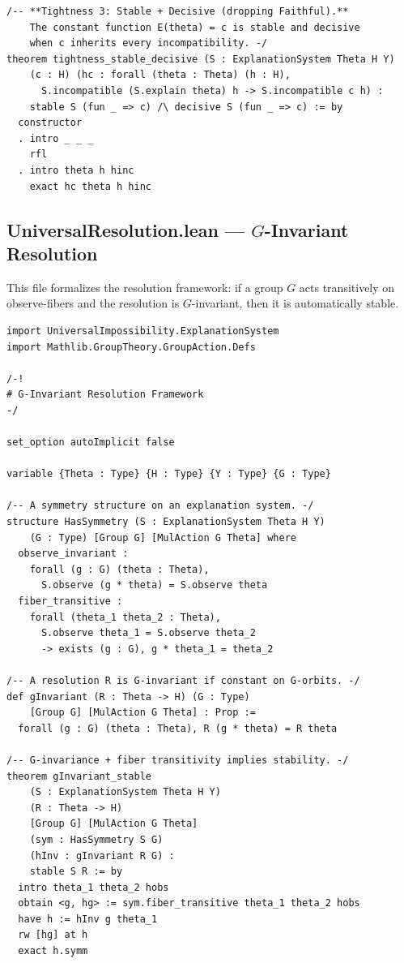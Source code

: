 \documentclass[11pt,a4paper]{article}
\begin{document}
\begin{lstlisting}[caption={ExplanationSystem.lean --- complete file},label={lst:explanation-system}]
/-- **Tightness 3: Stable + Decisive (dropping Faithful).**
    The constant function E(theta) = c is stable and decisive
    when c inherits every incompatibility. -/
theorem tightness_stable_decisive (S : ExplanationSystem Theta H Y)
    (c : H) (hc : forall (theta : Theta) (h : H),
      S.incompatible (S.explain theta) h -> S.incompatible c h) :
    stable S (fun _ => c) /\ decisive S (fun _ => c) := by
  constructor
  . intro _ _ _
    rfl
  . intro theta h hinc
    exact hc theta h hinc
\end{lstlisting}

\subsection[UniversalResolution.lean --- G-Invariant Resolution]{UniversalResolution.lean --- $G$-Invariant Resolution}
\label{app:lean-resolution}

This file formalizes the resolution framework: if a group $G$ acts transitively
on observe-fibers and the resolution is $G$-invariant, then it is automatically
stable.

\begin{lstlisting}[caption={UniversalResolution.lean --- complete file},label={lst:resolution}]
import UniversalImpossibility.ExplanationSystem
import Mathlib.GroupTheory.GroupAction.Defs

/-!
# G-Invariant Resolution Framework
-/

set_option autoImplicit false

variable {Theta : Type} {H : Type} {Y : Type} {G : Type}

/-- A symmetry structure on an explanation system. -/
structure HasSymmetry (S : ExplanationSystem Theta H Y)
    (G : Type) [Group G] [MulAction G Theta] where
  observe_invariant :
    forall (g : G) (theta : Theta),
      S.observe (g * theta) = S.observe theta
  fiber_transitive :
    forall (theta_1 theta_2 : Theta),
      S.observe theta_1 = S.observe theta_2
      -> exists (g : G), g * theta_1 = theta_2

/-- A resolution R is G-invariant if constant on G-orbits. -/
def gInvariant (R : Theta -> H) (G : Type)
    [Group G] [MulAction G Theta] : Prop :=
  forall (g : G) (theta : Theta), R (g * theta) = R theta

/-- G-invariance + fiber transitivity implies stability. -/
theorem gInvariant_stable
    (S : ExplanationSystem Theta H Y)
    (R : Theta -> H)
    [Group G] [MulAction G Theta]
    (sym : HasSymmetry S G)
    (hInv : gInvariant R G) :
    stable S R := by
  intro theta_1 theta_2 hobs
  obtain <g, hg> := sym.fiber_transitive theta_1 theta_2 hobs
  have h := hInv g theta_1
  rw [hg] at h
  exact h.symm
\end{lstlisting}
\end{document}
